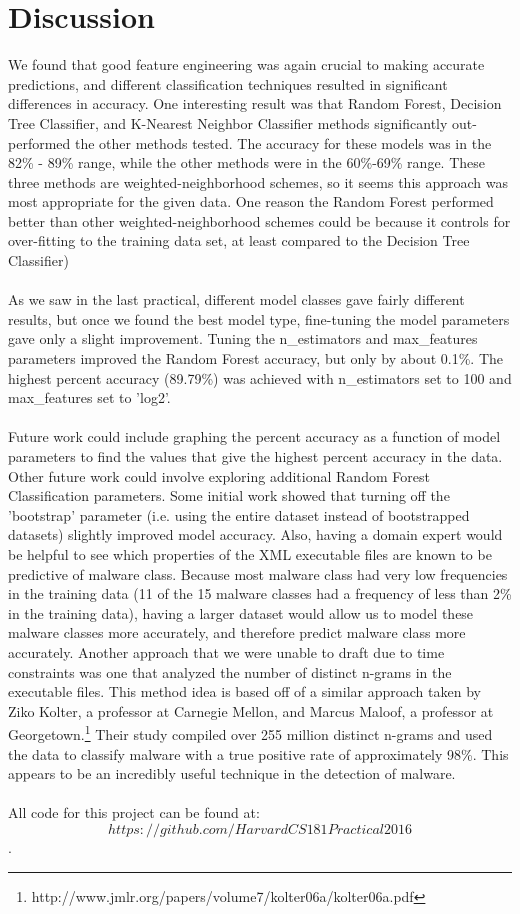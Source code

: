 \documentclass{article}
\begin{document}
\section{Discussion}
We found that good feature engineering was again crucial to making accurate predictions, and different classification techniques resulted in significant differences in accuracy. One interesting result was that Random Forest, Decision Tree Classifier, and K-Nearest Neighbor Classifier methods significantly out-performed the other methods tested. The accuracy for these models was in the 82\% - 89\% range, while the other methods were in the 60\%-69\% range.  These three methods are weighted-neighborhood schemes, so it seems this approach was most appropriate for the given data. One reason the Random Forest performed better than other weighted-neighborhood schemes could be because it controls for over-fitting to the training data set, at least compared to the Decision Tree Classifier)\\\\
As we saw in the last practical, different model classes gave fairly different results, but once we found the best model type, fine-tuning the model parameters gave only a slight improvement. Tuning the n\_estimators and max\_features parameters improved the Random Forest accuracy, but only by about 0.1\%. The highest percent accuracy (89.79\%) was achieved with n\_estimators set to 100 and max\_features set to 'log2'.\\\\
Future work could include graphing the percent accuracy as a function of model parameters to find the values that give the highest percent accuracy in the data. Other future work could involve exploring additional Random Forest Classification parameters. Some initial work showed that turning off the 'bootstrap' parameter (i.e. using the entire dataset instead of bootstrapped datasets) slightly improved model accuracy. Also, having a domain expert would be helpful to see which properties of the XML executable files are known to be predictive of malware class. Because most malware class had very low frequencies in the training data (11 of the 15 malware classes had a frequency of less than 2\% in the training data), having a larger dataset would allow us to model these malware classes more accurately, and therefore predict malware class more accurately. Another approach that we were unable to draft due to time constraints was one that analyzed the number of distinct n-grams in the executable files. This method idea is based off of a similar approach taken by Ziko Kolter, a professor at Carnegie Mellon, and Marcus Maloof, a professor at Georgetown.\footnote{http://www.jmlr.org/papers/volume7/kolter06a/kolter06a.pdf} Their study compiled over 255 million distinct n-grams and used the data to classify malware with a true positive rate of approximately 98\%. This appears to be an incredibly useful technique in the detection of malware. \\\\
All code for this project can be found at: $$https://github.com/HarvardCS181Practical2016$$.
\end{document}
